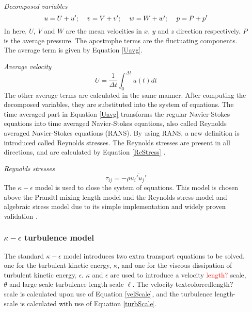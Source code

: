 \documentclass{CFD2017}
\begin{document}
\emph{Decomposed variables}
\begin{equation}
\label{decomposed}
u=U+u'; \hspace{4mm} v = V+v'; \hspace{4mm} w=W+w'; \hspace{4mm} p=P+p' 
\end{equation}
In here, $U$, $V$ and $W$ are the mean velocities in $x$, $y$ and $z$ direction respectively. $P$ is the average pressure. The apostrophe terms are the fluctuating components. The average term is given by Equation \ref{Uavg}.\vspace{2mm}

\emph{Average velocity}
\begin{equation}
\label{Uavg}
U = \frac{1}{\Delta t}\int_{0}^{\Delta t}u(t)dt
\end{equation}
The other average terms are calculated in the same manner. After computing the decomposed variables, they are substituted into the system of equations. The time averaged part in Equation \ref{Uavg} transforms the regular Navier-Stokes equations into time averaged Navier-Stokes equations, also called Reynolds averaged Navier-Stokes equations (RANS). By using RANS, a new definition is introduced called Reynolds stresses. The Reynolds stresses are present in all directions, and are calculated by Equation \ref{ReStress} \cite{slides}. \vspace{2mm}

\emph{Reynolds stresses}
\begin{equation}
\label{ReStress}
\tau_{ij}=-\rho\overline{u_i'u_j'}
\end{equation}
The $\kappa-\epsilon$ model is used to close the system of equations. This model is chosen above the Prandtl mixing length model and the Reynolds stress model and algebraic stress model due to its simple implementation and widely proven validation \cite{Versteeg2007}.


\subsubsection{$\kappa-\epsilon$ turbulence model}
The standard  $\kappa-\epsilon$ model introduces two extra transport equations to be solved. one for the turbulent kinetic energy, $\kappa$, and one for the viscous dissipation of turbulent kinetic energy, $\epsilon$.  $\kappa$ and $\epsilon$ are used to introduce a velocity \textcolor{red}{length?} scale, $\theta$ and large-scale turbulence length scale $\ell$. The velocity textcolor{red}{length?} scale is calculated upon use of Equation \ref{velScale}, and the turbulence length-scale is calculated with use of Equation \ref{turbScale}.\vspace{2mm}
\end{document}

